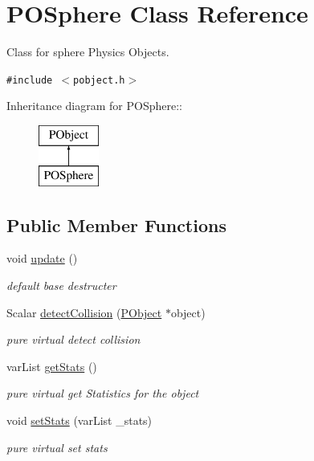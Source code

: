 \hypertarget{classPOSphere}{
\section{POSphere Class Reference}
\label{classPOSphere}
}
Class for sphere Physics Objects.  


{\tt \#include $<$pobject.h$>$}

Inheritance diagram for POSphere::\begin{figure}[H]
\begin{center}
\leavevmode
\includegraphics[height=2cm]{classPOSphere}
\end{center}
\end{figure}
\subsection*{Public Member Functions}
\begin{CompactItemize}
\item 
void \hyperlink{classPOSphere_17904f3eeceb2ba07931d6d359bbeebe}{update} ()
\begin{CompactList}\small\item\em default base destructer \item\end{CompactList}\item 
Scalar \hyperlink{classPOSphere_798625bc33390f84032dd30b5abaa112}{detectCollision} (\hyperlink{classPObject}{PObject} $\ast$object)
\begin{CompactList}\small\item\em pure virtual detect collision \item\end{CompactList}\item 
varList \hyperlink{classPOSphere_cab4d5434c63870cd383d38eb985a4fd}{getStats} ()
\begin{CompactList}\small\item\em pure virtual get Statistics for the object \item\end{CompactList}\item 
\hypertarget{classPOSphere_39a1a0d77b89ead931e6bef08d41bdd0}{
void \hyperlink{classPOSphere_39a1a0d77b89ead931e6bef08d41bdd0}{setStats} (varList \_\-stats)}
\label{classPOSphere_39a1a0d77b89ead931e6bef08d41bdd0}

\begin{CompactList}\small\item\em pure virtual set stats \item\end{CompactList}\end{CompactItemize}
